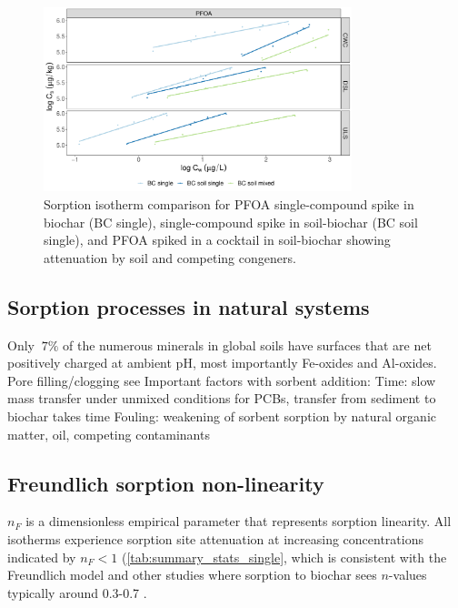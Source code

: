 \begin{figure}[htb]
    \centering
    \includegraphics[width=0.8\textwidth]{R/figs/Attenuation_isotherms_PFOA.pdf}
    \caption{Sorption isotherm comparison for PFOA single-compound spike in biochar (BC single), single-compound spike in soil-biochar (BC soil single), and PFOA spiked in a cocktail in soil-biochar showing attenuation by soil and competing congeners.}
    \label{fig:PFOA_attenuation}
\end{figure}

\subsection{Sorption processes in natural systems}
Only $~7\%$ of the numerous minerals in global soils have surfaces that are net positively charged at ambient pH, most importantly Fe-oxides and Al-oxides. 
Pore filling/clogging see \citep{Li2019}
Important factors with sorbent addition:
Time: slow mass transfer under unmixed conditions for PCBs, transfer from sediment to biochar takes time \citep{Werner2006}
Fouling: weakening of sorbent sorption by natural organic matter, oil, competing contaminants

\subsection{Freundlich sorption non-linearity}\label{sec:non-linearity}
$n_F$ is a dimensionless empirical parameter that represents sorption linearity. All isotherms experience sorption site attenuation at increasing concentrations indicated by $n_F<1 $ (\cref{tab:summary_stats_single}, which is consistent with the Freundlich model and other studies where sorption to biochar sees $n$-values typically around 0.3-0.7 \citep{Cornelissen2005}. 

